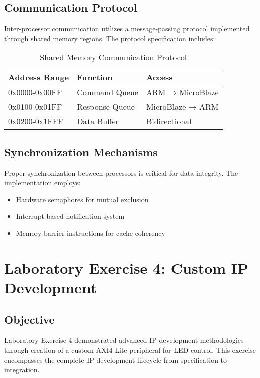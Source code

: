 \documentclass[11pt,a4paper]{article}
\begin{document}
\subsection{Communication Protocol}

Inter-processor communication utilizes a message-passing protocol implemented through shared memory regions. The protocol specification includes:

\begin{table}[H]
    \centering
    \caption{Shared Memory Communication Protocol}
    \begin{tabular}{@{}lll@{}}
        \toprule
        \textbf{Address Range} & \textbf{Function} & \textbf{Access} \\
        \midrule
        0x0000-0x00FF & Command Queue & ARM → MicroBlaze \\
        0x0100-0x01FF & Response Queue & MicroBlaze → ARM \\
        0x0200-0x1FFF & Data Buffer & Bidirectional \\
        \bottomrule
    \end{tabular}
    \label{tab:shared_memory}
\end{table}

\subsection{Synchronization Mechanisms}

Proper synchronization between processors is critical for data integrity. The implementation employs:

\begin{itemize}[leftmargin=*]
    \item Hardware semaphores for mutual exclusion
    \item Interrupt-based notification system
    \item Memory barrier instructions for cache coherency
\end{itemize}

\section{Laboratory Exercise 4: Custom IP Development}

\subsection{Objective}
Laboratory Exercise 4 demonstrated advanced IP development methodologies through creation of a custom AXI4-Lite peripheral for LED control. This exercise encompasses the complete IP development lifecycle from specification to integration.
\end{document}

